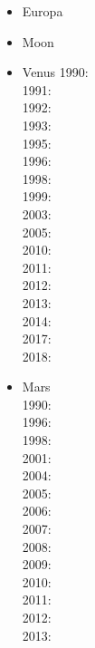\begin{itemize}
\item Europa 
{\scriptsize
\cite{shha04,shha05,mish05,hash08}\cite{hash10}\cite{hash11,kast14,almc19}
}
\item Moon 
{\scriptsize
\cite{elvh02}\cite{elhg04}\cite{devv10}\cite{dejv13} \cite{zhdv19}
} 
\item Venus 
{\scriptsize
1990: \cite{scbg90}\\
1991: \cite{lekb91}\\
1992: \cite{kiha92,sqjs92}\\
1993: \cite{kief93,lekb93}\\
1995: \cite{lekb95,mopa95}\\
1996: \cite{somo96}\\
1998: \cite{mazk98}\cite{resm98}\cite{moso98}\cite{phha98}\\
1999: \cite{resm99}\\
2003: \cite{vesh03}\\
2005: \cite{vavv05}\\
2010: \cite{stfh10}\\
2011: \cite{orso11}\\
2012: \cite{arta12}\\
2013: \cite{huyz13}\\
2014: \cite{gita14}\cite{gery14b}\\
2017: \cite{cram17}\cite{dast17}\\
2018: \cite{king18}
}
\item Mars \\
{\scriptsize
1990: \cite{scbg90}\\
1996: \cite{hach96}\\
1998: \cite{resm98}\\
2001: \cite{nist01}\\
2004: \cite{lenm04}\cite{vavv04c}\\
2005: \cite{vavv05}\cite{onml05}\\
2006: \cite{losh06,rozh06,keso06}\\
2007: \cite{rozh07}\\
2008: \cite{loha08}\\
2009: \cite{keta09,zhon09,rolm09,keso09}\\
2010: \cite{srzh10}\\
2011: \cite{gokg11}\\
2012: \cite{srzh12}\cite{roar12}\\
2013: \cite{ruts13}\\
}
\end{itemize}
